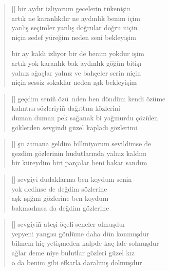 \documentclass[a5paper, openright, twoside]{memoir}
\begin{document}
\begin{verse}[\versewidth]
  bir aydır izliyorum gecelerin tükenişin \\
  artık ne karanlıkdır ne aydınlık benim içim \\
  yanlış seçimler yanlış doğrular doğru niçin \\
  niçin sedef yüreğim neden seni bekleyişim

  bir ay kaldı izliyor bir de benim yokdur işim \\
  artık yok karanlık bak aydınlık göğün bitişı \\
  yalnız ağaçlar yalnız ve bahçeler serin niçin \\
  niçin sessiz sokaklar neden ışık bekleyişim \\
\end{verse}
\begin{verse}[\versewidth]
  geçdim seni\~n özü~nden ben döndüm kendi özüme \\
  kalıntısı sözleriyi\~n dağıttım közlerini \\
  duman duman pek sağanak bi yağmurdu çözülen \\
  göklerden sevgindi güzel kapladı gözlerimi \\
\end{verse}
\begin{verse}[\versewidth]
  şu zamana geldim billmiyorum sevildimse de \\
  gezdim gözlerinin hudutlarında yalnız kaldım \\
  bir küreydim biri parçalar beni bakar sandım \\
\end{verse}
\begin{verse}[\versewidth]
  sevgiyi dudaklarına ben koydum senin \\
  yok dedinse de değdim sözlerine \\
  aşk ışığını gözlerine ben koydum \\
  bakmadınsa da değdim gözlerine \\
\end{verse}
\begin{verse}[\versewidth]
  sevgiyi\~n ateşi öçeli seneler olmuşdur \\
  yepyeni yangısı gönlüme daha dün konmuşdur \\
  bilmem hiç yetişmeden kalpde kaç lale solmuşdur \\
  ağlar deme niye bulutlar gözleri güzel kız \\
  o da benim gibi efkarla daralmış dolmuşdur \\
\end{verse}
\end{document}
